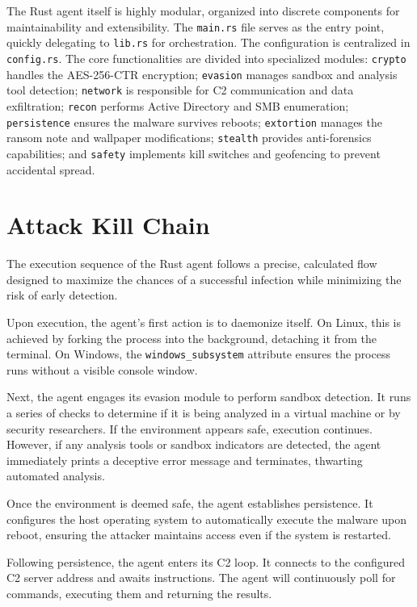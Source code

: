 \documentclass[12pt,a4paper]{article}
\newcommand{\code}[1]{\texttt{\textcolor{primaryblue}{#1}}}
\begin{document}
The Rust agent itself is highly modular, organized into discrete components for maintainability and extensibility. The \code{main.rs} file serves as the entry point, quickly delegating to \code{lib.rs} for orchestration. The configuration is centralized in \code{config.rs}. The core functionalities are divided into specialized modules: \code{crypto} handles the AES-256-CTR encryption; \code{evasion} manages sandbox and analysis tool detection; \code{network} is responsible for C2 communication and data exfiltration; \code{recon} performs Active Directory and SMB enumeration; \code{persistence} ensures the malware survives reboots; \code{extortion} manages the ransom note and wallpaper modifications; \code{stealth} provides anti-forensics capabilities; and \code{safety} implements kill switches and geofencing to prevent accidental spread.

\section{Attack Kill Chain}

The execution sequence of the Rust agent follows a precise, calculated flow designed to maximize the chances of a successful infection while minimizing the risk of early detection.

Upon execution, the agent's first action is to daemonize itself. On Linux, this is achieved by forking the process into the background, detaching it from the terminal. On Windows, the \code{windows\_subsystem} attribute ensures the process runs without a visible console window.

Next, the agent engages its evasion module to perform sandbox detection. It runs a series of checks to determine if it is being analyzed in a virtual machine or by security researchers. If the environment appears safe, execution continues. However, if any analysis tools or sandbox indicators are detected, the agent immediately prints a deceptive error message and terminates, thwarting automated analysis.

Once the environment is deemed safe, the agent establishes persistence. It configures the host operating system to automatically execute the malware upon reboot, ensuring the attacker maintains access even if the system is restarted.

Following persistence, the agent enters its C2 loop. It connects to the configured C2 server address and awaits instructions. The agent will continuously poll for commands, executing them and returning the results. 
\end{document}
